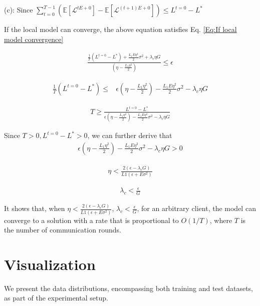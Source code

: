 (c): Since $\sum_{t=0}^{T-1}(\mathbb{E}[\mathcal{L}^{tE+0}] - \mathbb{E}\left[\mathcal{L}^{(t+1)E+0}\right]) \le L^{t = 0} - L^*$

If the local model can converge, the above equation satisfies Eq. \ref{Eq:If local model convergence}

\begin{align}
    \frac{\frac{1}{T}(L^{t = 0} - L^*) + \frac{L_1 E \eta^2}{2} \sigma^2 + \lambda_c \eta G}{\left(\eta - \frac{L_1 \eta^2}{2}\right)} \le \epsilon
    \label{Eq:If local model convergence}
\end{align}

\begin{align}
    \frac{1}{T}(L^{t = 0} - L^*) \le & \epsilon\left(\eta - \frac{L_1 \eta^2}{2}\right) - \frac{L_1 E \eta^2}{2} \sigma^2 - \lambda_c \eta G
\end{align}

\begin{align}
    T \ge \frac{L^{t = 0} - L^*}{\epsilon\left(\eta - \frac{L_1 \eta^2}{2}\right) - \frac{L_1 E \eta^2}{2} \sigma^2 - \lambda_c \eta G}
\end{align}

Since $T > 0, L^{t = 0} - L^* > 0$, we can further derive that
\begin{align}
    \epsilon\left(\eta - \frac{L_1 \eta^2}{2}\right) - \frac{L_1 E \eta^2}{2} \sigma^2 - \lambda_c \eta G > 0
\end{align}

\begin{align}
    \eta < \frac{2(\epsilon - \lambda_c G)}{L1(\epsilon + E \sigma^2)}
\end{align}

\begin{align}
    \lambda_c < \frac{\epsilon}{G}
\end{align}

It shows that, when $\eta < \frac{2(\epsilon - \lambda_c G)}{L1(\epsilon + E \sigma^2)}$, $\lambda_c < \frac{\epsilon}{G}$, for an arbitrary client, the model can converge to a solution with a rate that is proportional to $O(1/T )$, where $T$ is the number of communication rounds.

\section{Visualization}
\label{sec:visualization}
We present the data distributions, encompassing both training and test datasets, as part of the experimental setup.

